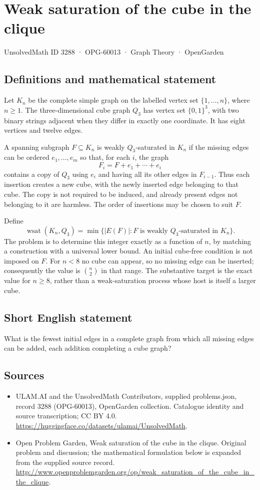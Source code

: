 \documentclass[11pt,a4paper]{article}
\begin{document}
\section*{Weak saturation of the cube in the clique}\label{3288}
{\small UnsolvedMath ID 3288 · OPG-60013 · Graph Theory · OpenGarden}
\subsection{Definitions and mathematical statement}
Let $K_n$ be the complete simple graph on the labelled vertex set
$\{1,\ldots,n\}$, where $n\ge1$. The three-dimensional cube graph $Q_3$
has vertex set $\{0,1\}^3$, with two binary strings adjacent when they
differ in exactly one coordinate. It has eight vertices and twelve
edges.

A spanning subgraph $F\subseteq K_n$ is weakly $Q_3$-saturated in $K_n$
if the missing edges can be ordered $e_1,\ldots,e_m$ so that, for each
$i$, the graph
\[
                   F_i=F+e_1+\cdots+e_i
\]
contains a copy of $Q_3$ using $e_i$ and having all its other edges in
$F_{i-1}$. Thus each insertion creates a new cube, with the newly
inserted edge belonging to that cube. The copy is not required to be
induced, and already present edges not belonging to it are harmless.
The order of insertions may be chosen to suit $F$.

Define
\[
 \operatorname{wsat}(K_n,Q_3)=
       \min\{|E(F)|:F\text{ is weakly }Q_3\text{-saturated in }K_n\}.
\]
The problem is to determine this integer exactly as a function of $n$,
by matching a construction with a universal lower bound. An initial
cube-free condition is not imposed on $F$. For $n<8$ no cube can appear,
so no missing edge can be inserted; consequently the value is
$\binom n2$ in that range. The substantive target is the exact value
for $n\ge8$, rather than a weak-saturation process whose host is itself
a larger cube.
\subsection{Short English statement}
What is the fewest initial edges in a complete graph from which all missing edges can be added, each addition completing a cube graph?
\subsection{Sources}
\begin{itemize}
\item[S1] ULAM.AI and the UnsolvedMath Contributors, supplied problems.json, record 3288 (OPG-60013), OpenGarden collection. Catalogue identity and source transcription; CC BY 4.0.
\url{https://huggingface.co/datasets/ulamai/UnsolvedMath}.
\item[S2] Open Problem Garden, Weak saturation of the cube in the clique. Original problem and discussion; the mathematical formulation below is expanded from the supplied source record.
\url{http://www.openproblemgarden.org/op/weak_saturation_of_the_cube_in_the_clique}.
\end{itemize}
\end{document}
